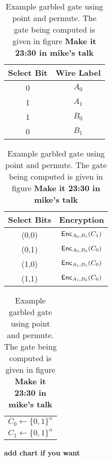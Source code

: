 \begin{table}[h]
    \centering
    \begin{tabular}{|c|c|}
        \hline
        Select Bit & Wire Label \\
        \hline
        0 & $A_0$ \\
        1 & $A_1$ \\
        1 & $B_0$ \\
        0 & $B_1$ \\
        \hline
    \end{tabular}
    \qquad
    \begin{tabular}{|c|c|}
        \hline
        Select Bits & Encryption \\
        \hline
        (0,0) & $\textsf{Enc}_{A_0, B_1}(C_1)$ \\
        (0,1) & $\textsf{Enc}_{A_0, B_0}(C_0)$ \\
        (1,0) & $\textsf{Enc}_{A_1, B_1}(C_0)$ \\
        (1,1) & $\textsf{Enc}_{A_1, B_0}(C_0)$ \\
        \hline
    \end{tabular}
    \qquad
    \begin{tabular}{|c|}
        \hline
        $C_0 \gets \{0,1\}^n$ \\
        $C_1 \gets \{0,1\}^n$ \\
        \hline
    \end{tabular}
    \caption{Garbled Gate for Point and Permute}
    \caption{Example garbled gate using point and permute. The gate being computed is given in figure \textbf{Make it 23:30 in mike's talk}}
\end{table}

\textbf{add chart if you want}


